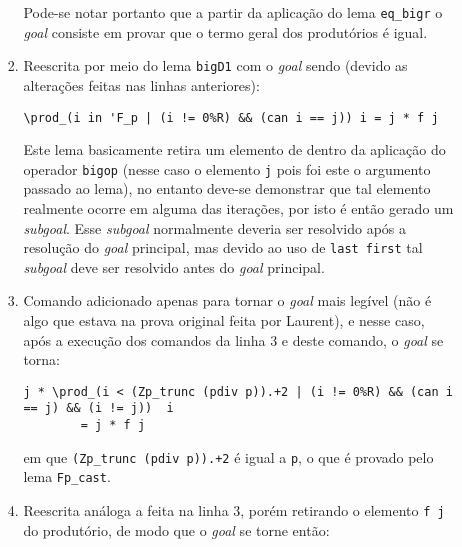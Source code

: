 \begin{enumerate}[label=\textbf{\roman*.}]
\begin{enumerate}[label=\textbf{\roman{enumi}.(\alph*)}]
\begin{enumerate}[listparindent=\parindent]
                        Pode-se notar portanto que a partir da aplicação do lema \lstinline[language=coq]|eq_bigr| o \textit{goal} consiste em provar que o termo geral dos produtórios é igual.
                        
                        \item[\textbf{(\ref{line:28-item4-a})}] Reescrita por meio do lema \lstinline[language=coq]|bigD1| com o \textit{goal} sendo (devido as alterações feitas nas linhas anteriores):
                        
                                \begin{lstlisting}[language=coq,frame=single,tabsize=1]
\prod_(i in 'F_p | (i != 0%R) && (can i == j)) i = j * f j
                                \end{lstlisting}
                        Este lema basicamente retira um elemento de dentro da aplicação do operador \lstinline[language=coq]|bigop| (nesse caso o elemento \lstinline[language=coq]|j| pois foi este o argumento passado ao lema), no entanto deve-se demonstrar que tal elemento realmente ocorre em alguma das iterações, por isto é então gerado um \textit{subgoal}. Esse \textit{subgoal} normalmente deveria ser resolvido após a resolução do \textit{goal} principal, mas devido ao uso de \lstinline[language=coq]|last first| tal \textit{subgoal} deve ser resolvido antes do \textit{goal} principal.
                        
                        \item[\textbf{(\ref{line:30-item4-a})}] Comando adicionado apenas para tornar o \textit{goal} mais legível (não é algo que estava na prova original feita por Laurent), e nesse caso, após a execução dos comandos da linha 3 e deste comando, o \textit{goal} se torna:
                        
                                \begin{lstlisting}[language=coq,frame=single,tabsize=1]
j * \prod_(i < (Zp_trunc (pdiv p)).+2 | (i != 0%R) && (can i == j) && (i != j))  i 
        = j * f j
                                \end{lstlisting}
                        em que \lstinline[language=coq]|(Zp_trunc (pdiv p)).+2| é igual a \lstinline[language=coq]|p|, o que é provado pelo lema \lstinline[language=coq]|Fp_cast|.
                        
                        \item[\textbf{(\ref{line:31-item4-a})}] Reescrita análoga a feita na linha 3, porém retirando o elemento \lstinline[language=coq]|f j| do produtório, de modo que o \textit{goal} se torne então:
                        

\end{enumerate}
\end{enumerate}
\end{enumerate}
